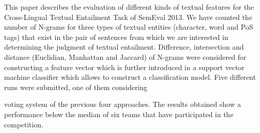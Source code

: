 This paper describes the evaluation of different kinds of textual features for the Cross-Lingual Textual Entailment Task of SemEval 2013. We have counted the
 number of N-grams for three types of textual entities (character, word and PoS
 tags) that exist in the pair of sentences from which we are interested in
 determining the judgment of textual entailment. Difference, intersection and
 distance (Euclidian, Manhattan and Jaccard) of N-grams were considered for
 constructing a feature vector which is further introduced in a support vector
 machine classifier which allows to construct a classification model. Five
 different runs were submitted, one of them considering                               
      
 
 voting
 system of
 the
 previous four approaches. The results obtained show a performance below the
 median of six teams that have participated in the competition.

